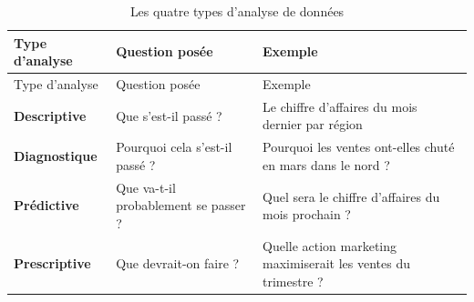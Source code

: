 \documentclass[
  french,
  letterpaper,
  open=any]{scrbook}
\theoremstyle{definition}
\theoremstyle{definition}
\theoremstyle{remark}
\begin{document}
\begin{longtable}[]{@{}
  >{\raggedright\arraybackslash}p{}
  >{\raggedright\arraybackslash}p{}
  >{\raggedright\arraybackslash}p{}@{}}
\caption{Les quatre types d'analyse de
données}\label{tbl-types-analyse}\tabularnewline
\toprule\noalign{}
\begin{minipage}[b]{\linewidth}\raggedright
Type d'analyse
\end{minipage} & \begin{minipage}[b]{\linewidth}\raggedright
Question posée
\end{minipage} & \begin{minipage}[b]{\linewidth}\raggedright
Exemple
\end{minipage} \\
\midrule\noalign{}
\endfirsthead
\toprule\noalign{}
\begin{minipage}[b]{\linewidth}\raggedright
Type d'analyse
\end{minipage} & \begin{minipage}[b]{\linewidth}\raggedright
Question posée
\end{minipage} & \begin{minipage}[b]{\linewidth}\raggedright
Exemple
\end{minipage} \\
\midrule\noalign{}
\endhead
\bottomrule\noalign{}
\endlastfoot
\textbf{Descriptive} & Que s'est-il passé ? & Le chiffre d'affaires du
mois dernier par région \\
\textbf{Diagnostique} & Pourquoi cela s'est-il passé ? & Pourquoi les
ventes ont-elles chuté en mars dans le nord ? \\
\textbf{Prédictive} & Que va-t-il probablement se passer ? & Quel sera
le chiffre d'affaires du mois prochain ? \\
\textbf{Prescriptive} & Que devrait-on faire ? & Quelle action marketing
maximiserait les ventes du trimestre ? \\
\end{longtable}
\end{document}
